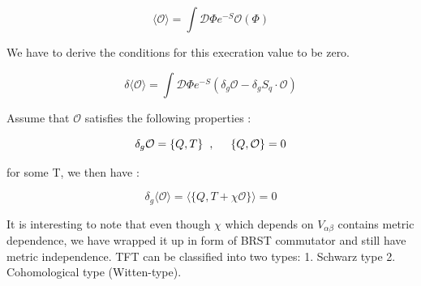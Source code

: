 \begin{equation}
 \langle \mathcal{O} \rangle = \int \mathcal{D} \Phi e^{-S} \mathcal{O}(\Phi)
 \end{equation}

We have to derive the conditions for this execration value to be zero. 

\begin{equation}
\delta \langle \mathcal{O} \rangle = \int \mathcal{D} \Phi e^{-S} (\delta_{g} \mathcal{O} - \delta_{g} S_{q} \cdot \mathcal{O})
\end{equation}


Assume that $\mathcal{O}$ satisfies the following properties :

\begin{equation}
\delta_{g} \mathcal{O} = \{Q, T\}  \hspace{2mm} , \hspace{5mm} \{Q, \mathcal{O}\} = 0
\end{equation}


for some T, we then have :

\begin{equation}
\delta_{g}\langle \mathcal{O} \rangle = \langle \{Q, T + \chi \mathcal{O}\}\rangle = 0
\end{equation}

It is interesting to note that even though $\chi$ which depends on $V_{\alpha\beta}$ contains metric dependence, 
we have wrapped it up in form of BRST commutator and still have metric independence. TFT can be classified into
 two types: 1. Schwarz type 2. Cohomological type (Witten-type). 

\vspace{5mm} 



